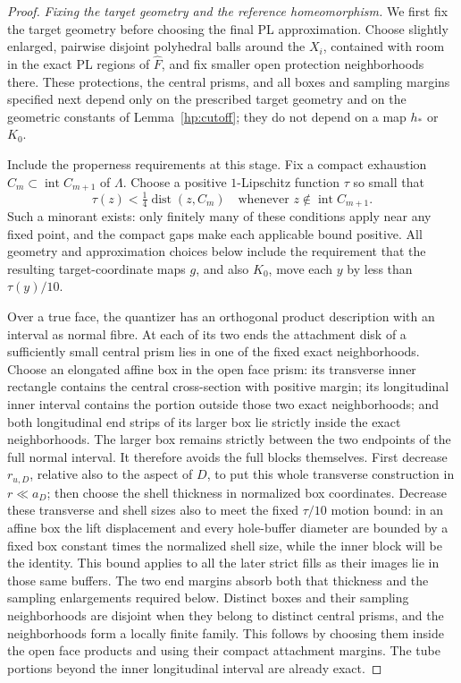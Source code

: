 \documentclass[11pt]{article}
\numberwithin{equation}{section}
\theoremstyle{definition}
\theoremstyle{remark}
\begin{document}
\begin{proof}
\emph{Fixing the target geometry and the reference homeomorphism.}
We first fix the target geometry before choosing the final PL
approximation.  Choose slightly enlarged, pairwise disjoint polyhedral
balls around the $X_i$, contained with room in the exact PL regions of
$\widehat F$, and fix smaller open protection neighborhoods there.
These protections, the central prisms, and all boxes and sampling
margins specified next depend only on the prescribed target geometry
and on the geometric constants of Lemma~\ref{hp:cutoff}; they do not
depend on a map $h_*$ or $K_0$.

Include the properness requirements at this stage.  Fix a compact
exhaustion $C_m\subset\operatorname{int}C_{m+1}$ of $\Lambda$.
Choose a positive $1$-Lipschitz function $\tau$ so small that
\[
 \tau(z)<\tfrac14\operatorname{dist}(z,C_m)
 \quad\text{whenever }z\notin\operatorname{int}C_{m+1}.
\]
Such a minorant exists: only finitely many of these conditions apply
near any fixed point, and the compact gaps make each applicable
bound positive.  All geometry and approximation choices below include
the requirement that the resulting target-coordinate maps $g$, and
also $K_0$, move each $y$ by less than $\tau(y)/10$.

Over a true face, the quantizer has an orthogonal product description
with an interval as normal fibre.  At each of its two ends the
attachment disk of a sufficiently small central prism lies in one of
the fixed exact neighborhoods.  Choose an elongated affine box in
the open face prism: its transverse inner rectangle contains the
central cross-section with positive margin; its longitudinal inner
interval contains the portion outside those two exact neighborhoods;
and both longitudinal end strips of its larger box lie strictly inside
the exact neighborhoods.  The larger box remains strictly between
the two endpoints of the full normal interval.  It therefore avoids
the full blocks themselves.  First decrease $r_{u,D}$, relative also
to the aspect of $D$, to put this whole transverse construction in
$r\ll a_D$; then choose the shell thickness in normalized box
coordinates.  Decrease these transverse and shell sizes also to meet
the fixed $\tau/10$ motion bound: in an affine box the lift displacement
and every hole-buffer diameter are bounded by a fixed box constant
times the normalized shell size, while the inner block will be the
identity.  This bound applies to all the later strict fills as their
images lie in those same buffers.  The two end margins absorb both
that thickness and the sampling enlargements required below.  Distinct boxes and their
sampling neighborhoods are disjoint when they belong to distinct
central prisms, and the neighborhoods form a locally finite family.
This follows by choosing them inside the open face products and
using their compact attachment margins.  The tube portions beyond
the inner longitudinal interval are already exact.


\end{proof}
\end{document}
